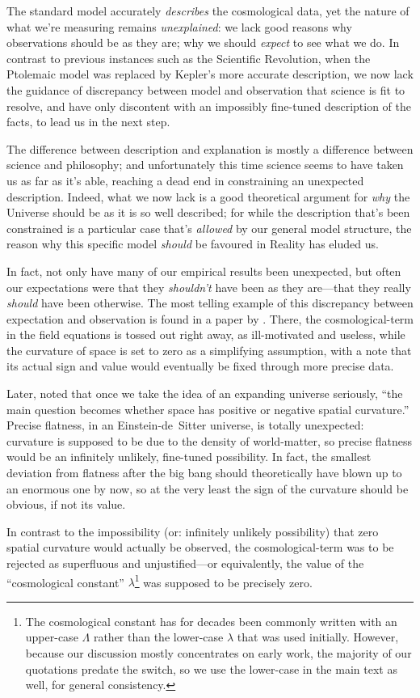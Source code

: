 \documentclass[12 pt]{article}
\begin{document}
The standard model accurately \textit{describes} the cosmological data, yet the nature of what we're measuring remains \textit{unexplained}: we lack good reasons why observations should be as they are; why we should \textit{expect} to see what we do. In contrast to previous instances such as the Scientific Revolution, when the Ptolemaic model was replaced by Kepler's more accurate description, we now lack the guidance of discrepancy between model and observation that science is fit to resolve, and have only discontent with an impossibly fine-tuned description of the facts, to lead us in the next step. 

The difference between description and explanation is mostly a difference between science and philosophy; and unfortunately this time science seems to have taken us as far as it's able, reaching a dead end in constraining an unexpected description. Indeed, what we now lack is a good theoretical argument for \textit{why} the Universe should be as it is so well described; for while the description that's been constrained is a particular case that's \textit{allowed} by our general model structure, the reason why this specific model \textit{should} be favoured in Reality has eluded us. 

In fact, not only have many of our empirical results been unexpected, but often our expectations were that they \textit{shouldn't} have been as they are---that they really \textit{should} have been otherwise. The most telling example of this discrepancy between expectation and observation is found in a paper by \citet{Einstein1932}. There, the cosmological-term in the field equations is tossed out right away, as ill-motivated and useless, while the curvature of space is set to zero as a simplifying assumption, with a note that its actual sign and value would eventually be fixed through more precise data. 

Later, \citet{Einstein1945} noted that once we take the idea of an expanding universe seriously, ``the main question becomes whether space has positive or negative spatial curvature.'' Precise flatness, in an Einstein-de~Sitter universe, is totally unexpected: curvature is supposed to be due to the density of world-matter, so precise flatness would be an infinitely unlikely, fine-tuned possibility. In fact, the smallest deviation from flatness after the big bang should theoretically have blown up to an enormous one by now, so at the very least the sign of the curvature should be obvious, if not its value. 

In contrast to the impossibility (or: infinitely unlikely possibility) that zero spatial curvature would actually be observed, the cosmological-term was to be rejected as superfluous and unjustified---or equivalently, the value of the ``cosmological constant'' $\lambda$\footnote{The cosmological constant has for decades been commonly written with an upper-case $\Lambda$ rather than the lower-case $\lambda$ that was used initially. However, because our discussion mostly concentrates on early work, the majority of our quotations predate the switch, so we use the lower-case in the main text as well, for general consistency.}  was supposed to be precisely zero.
\end{document}
